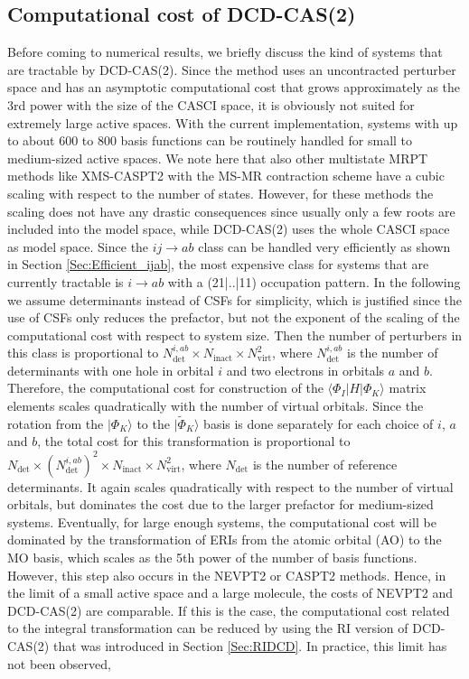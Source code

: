 \subsection{Computational cost of DCD-CAS(2)}
\label{Sec:DCD_cost}
Before coming to numerical results, we briefly discuss the kind of systems that are tractable by DCD-CAS(2). Since the method uses an uncontracted perturber space and has an asymptotic computational cost that grows approximately as the 3rd power with the size of the CASCI space, it is obviously not suited for extremely large active spaces. With the current implementation, systems with up to about 600 to 800 basis functions can be routinely handled for small to medium-sized active spaces. We note here that also other multistate MRPT methods like XMS-CASPT2 with the MS-MR contraction scheme have a cubic scaling with respect to the number of states.\cite{YanaiSXCKGS_2017_4829} However, for these methods the scaling does not have any drastic consequences since usually only a few roots are included into the model space, while DCD-CAS(2) uses the whole CASCI space as model space. Since the $ij\rightarrow ab$ class can be handled very efficiently as shown in Section \ref{Sec:Efficient_ijab}, the most expensive class for systems that are currently tractable is $i\rightarrow ab$ with a (21|..|11) occupation pattern. In the following we assume determinants instead of CSFs for simplicity, which is justified since the use of CSFs only reduces the prefactor, but not the exponent of the scaling of the computational cost with respect to system size. Then the number of perturbers in this class is proportional to $N_{{\text{det}}}^{i,ab} \times {N_{{\text{inact}}}} \times N_{{\text{virt}}}^2$, where $N_{{\text{det}}}^{i,ab}$ is the number of determinants with one hole in orbital $i$ and two electrons in orbitals $a$ and $b$. Therefore, the computational cost for construction of the $\langle {\Phi _I}|H|{\Phi _K}\rangle $ matrix elements scales quadratically with the number of virtual orbitals. Since the rotation from the $|{\Phi _K}\rangle $ to the $|{\tilde \Phi _K}\rangle $ basis is done separately for each choice of $i$, $a$ and $b$, the total cost for this transformation is proportional to ${N_{{\text{det}}}} \times {(N_{{\text{det}}}^{i,ab})^2} \times {N_{{\text{inact}}}} \times N_{{\text{virt}}}^2$, where $N_\text{det}$ is the number of reference determinants. It again scales quadratically with respect to the number of virtual orbitals, but dominates the cost due to the larger prefactor for medium-sized systems. Eventually, for large enough systems, the computational cost will be dominated by the transformation of ERIs from the atomic orbital (AO) to the MO basis, which scales as the 5th power of the number of basis functions. However, this step also occurs in the NEVPT2 or CASPT2 methods. Hence, in the limit of a small active space and a large molecule, the costs of NEVPT2 and DCD-CAS(2) are comparable. If this is the case, the computational cost related to the integral transformation can be reduced by using the RI version of DCD-CAS(2) that was introduced in Section \ref{Sec:RIDCD}. In practice, this limit has not been observed, 
